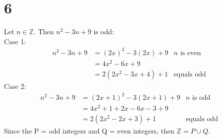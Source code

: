 \documentclass[danish,english,10pt,a4paper]{article}
\begin{document}
\section*{6}
Let $n \in \mathbb{Z}$. Then $n^2-3n+9$ is odd:
\\
Case 1:
\begin{align*}
n^2-3n+9 &= (2x)^2-3(2x)+9 & n \text{ is even}\\
	&=4x^2-6x+9	\\
	&=2(2x^2-3x+4)+1 & \text{equals odd}
\end{align*}
Case 2:
\begin{align*}
n^2-3n+9 &= (2x+1)^2-3(2x+1)+9 & n \text{ is odd}\\
	&=4x^2+1+2x-6x-3+9	\\
	&=2(2x^2-2x+3)+1 & \text{equals odd}
\end{align*}
Since the P = odd integers and Q = even integers, then $\mathbb{Z} = P \cup Q$.
\end{document}
